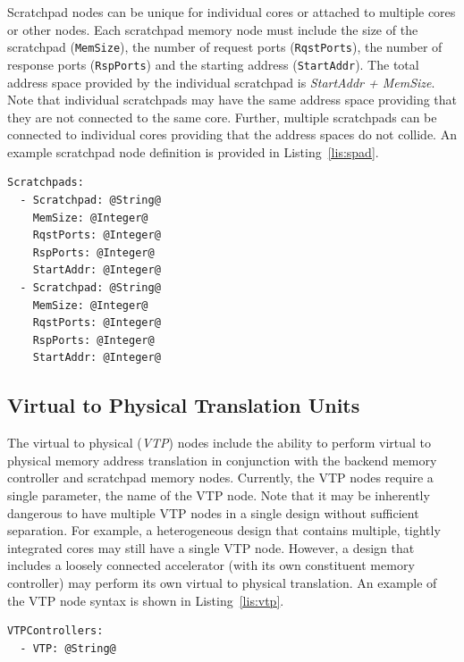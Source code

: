 \documentclass{article}
\begin{document}
Scratchpad nodes can be unique for individual cores or attached to multiple cores or other 
nodes.  Each scratchpad memory node must include the size of the scratchpad (\texttt{MemSize}), 
the number of request ports (\texttt{RqstPorts}), the number of response ports (\texttt{RspPorts}) 
and the starting address (\texttt{StartAddr}).  The total address space provided by the individual scratchpad 
is \textit{StartAddr + MemSize}.  Note that individual scratchpads may have the same address space providing that 
they are not connected to the same core.  Further, multiple scratchpads can be connected to individual cores 
providing that the address spaces do not collide.  An example scratchpad node definition is provided in Listing~\ref{lis:spad}.    

\vspace{0.125in}
\begin{lstlisting}[frame=single,style=base,caption={Scratchpad Node Definition},captionpos=b,label={lis:spad}]
Scratchpads:
  - Scratchpad: @String@
    MemSize: @Integer@
    RqstPorts: @Integer@
    RspPorts: @Integer@
    StartAddr: @Integer@
  - Scratchpad: @String@
    MemSize: @Integer@
    RqstPorts: @Integer@
    RspPorts: @Integer@
    StartAddr: @Integer@
\end{lstlisting}

\clearpage
\subsection{Virtual to Physical Translation Units}
\label{sec:VTOPNodes}

The virtual to physical (\textit{VTP}) nodes include the ability to perform virtual to physical memory address 
translation in conjunction with the backend memory controller and scratchpad memory nodes.  Currently, 
the VTP nodes require a single parameter, the name of the VTP node.  Note that it may be inherently dangerous 
to have multiple VTP nodes in a single design without sufficient separation.  For example, a heterogeneous design 
that contains multiple, tightly integrated cores may still have a single VTP node.  However, a design that includes 
a loosely connected accelerator (with its own constituent memory controller) may perform its own virtual to physical 
translation.  An example of the VTP node syntax is shown in Listing~\ref{lis:vtp}.  

\vspace{0.125in}
\begin{lstlisting}[frame=single,style=base,caption={VTP Node Definition},captionpos=b,label={lis:vtp}]
VTPControllers:
  - VTP: @String@
\end{lstlisting}
\end{document}
